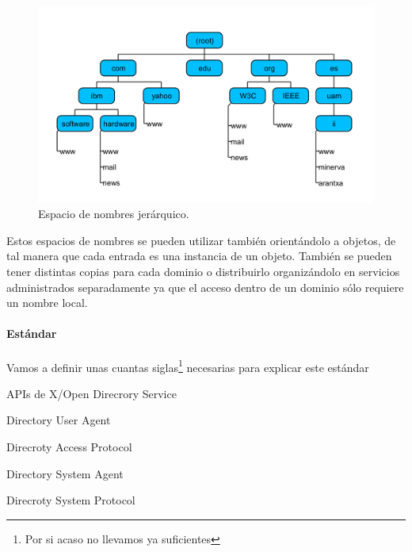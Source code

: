 \begin{figure}[hbtp]
\centering
\includegraphics[width=1\textwidth]{img/namespaces.png}
\caption{Espacio de nombres jerárquico.}
\label{namespaces}
\end{figure}

Estos espacios de nombres se pueden utilizar también orientándolo a objetos, de tal manera que cada entrada es una instancia de un objeto. También se pueden tener distintas copias para cada dominio o distribuirlo organizándolo en servicios administrados separadamente ya que el acceso dentro de un dominio sólo requiere un nombre local.

\paragraph{Estándar }
Vamos a definir unas cuantas siglas\footnote{Por si acaso no llevamos ya suficientes} necesarias para explicar este estándar

\begin{defn}[XDS]
	APIs de X/Open Direcrory Service
\end{defn}

\begin{defn}[DUA]
	Directory User Agent
\end{defn}

\begin{defn}[DAP]
	Direcroty Access Protocol
\end{defn}

\begin{defn}[DSA]
	Directory System Agent
\end{defn}

\begin{defn}[DSP]
	Direcroty System Protocol
\end{defn}

